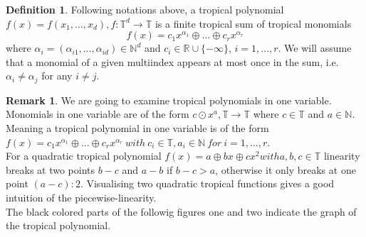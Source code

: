 \documentclass{article}
\theoremstyle{definition}
\newtheorem{definition}[theorem]{Definition}
\newtheorem{example}[theorem]{Remark}
\begin{document}
\begin{definition}\label{tropPolyn}
\cite[p.~2]{zhang2018tropical}
Following notations above, a tropical polynomial $f(x)=f(x_1, \dots , x_d), f: \mathbb{T}^{d} \to \mathbb{T}$ is a finite tropical sum of tropical monomials 
$$ f(x)=c_1x^{\alpha_1} \oplus \dots \oplus c_rx^{\alpha_r}$$
where $\alpha_i = (\alpha_{i1}, \dots , \alpha_{id}) \in \mathbb{N}^{d}$ and $c_i \in \mathbb{R} \cup \{- \infty \}$, $i = 1, \dots , r$. We will assume that a monomial of a given multiindex appears at most once in the sum, i.e. $\alpha_i \neq \alpha_j$ for any $i \neq j$.
\end{definition}

\begin{example}
We are going to examine tropical polynomials in one variable. Monomials in one variable are of the form $ c \odot x^{a}, \mathbb{T} \to \mathbb{T}$ where $c \in \mathbb{T}$ and $ a \in \mathbb{N} $. Meaning a tropical polynomial in one variable is of the form $f(x)=c_1x^{\alpha_1} \oplus \dots \oplus c_rx^{\alpha_r} \ with \ c_i \in \mathbb{T}, a_i \in \mathbb{N} \ for \ i=1, \dots , r$. \\
For a quadratic tropical polynomial $f(x) = a \oplus bx \oplus cx^{2} with a,b,c \in \mathbb{T}$ linearity breaks at two points $b-c$ and $a-b$ if $b-c > a$, otherwise it only breaks at one point $(a-c):2$. Visualising two quadratic tropical functions gives a good intuition of the piecewise-linearity. \\
The black colored parts of the followig figures one and two indicate the graph of the tropical polynomial.

\begin{figure}[h]


\end{figure}
\end{example}
\end{document}
